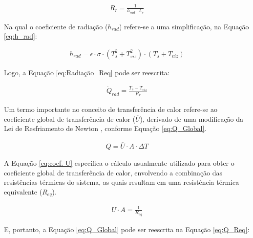 \documentclass[acronym,symbols,table]{fei}
\begin{document}
\begin{equation} \label{eq:Rradiação_R}
\begin{aligned}
    {R}_{r}=\frac{1}{h_{rad} \cdot A_{s}}
\end{aligned}
\end{equation}

Na qual o coeficiente de radiação ($h_{rad}$) refere-se a uma simplificação, na Equação \ref{eq:h_rad}:

\begin{equation} \label{eq:h_rad}
\begin{aligned}
    {h}_{rad}=\epsilon \cdot \sigma \cdot (T_{s}^2+T_{viz}^2) \cdot (T_{s}+T_{viz})
\end{aligned}
\end{equation}

Logo, a Equação \ref{eq:Radiação_Req} pode ser reescrita:

\begin{equation} \label{eq:Radiação_Req}
\begin{aligned}
    \dot{Q}_{rad}=\frac {T_{s}-T_{viz}}{{R}_{r}}
\end{aligned}
\end{equation}

Um termo importante no conceito de transferência de calor refere-se ao coeficiente global de transferência de calor ($\overline{U}$), derivado de uma modificação da Lei de Resfriamento de Newton \cite{kreith1999mechanical}, conforme Equação \ref{eq:Q_Global}.

\begin{equation} \label{eq:Q_Global}
\begin{aligned}
    \dot{Q}=\overline{U} \cdot A \cdot \Delta T
\end{aligned}
\end{equation}

A Equação \ref{eq:coef. U} especifica o cálculo usualmente utilizado para obter o coeficiente global de transferência de calor, envolvendo a combinação das resistências térmicas do sistema, as quais resultam em uma resistência térmica equivalente ($R_{eq}$).

\begin{equation} \label{eq:coef. U}
\begin{aligned}
    \overline{U} \cdot A=\frac{1}{R_{eq}}
\end{aligned}
\end{equation}

E, portanto, a Equação \ref{eq:Q_Global} pode ser reescrita na Equação \ref{eq:Q_Req}:
\end{document}
